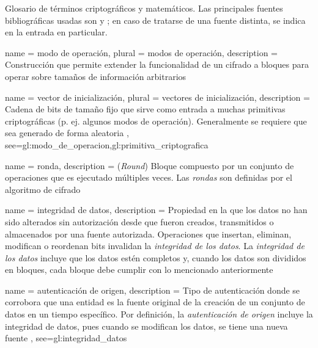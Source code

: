 %
%
%


\makeglossaries

\setglossarypreamble
{%
  Glosario de términos criptográficos y matemáticos. Las principales fuentes
  bibliográficas usadas son \cite{menezes} y \cite{stallings}; en caso de
  tratarse de una fuente distinta, se indica en la entrada en particular.
}

{
  name = modo de operación,
  plural = modos de operación,
  description = {
    Construcción que permite extender la funcionalidad de un cifrado a bloques
    para operar sobre tamaños de información arbitrarios%
  }
}

{
  name = vector de inicialización,
  plural = vectores de inicialización,
  description = {
    Cadena de bits de tamaño fijo que sirve como entrada a muchas primitivas
    criptográficas (p. ej. algunos modos de operación). Generalmente
    se requiere que sea generado de forma aleatoria%
  },
  see={gl:modo_de_operacion,gl:primitiva_criptografica}
}

{
  name = ronda,
  description = {
    (\textit{Round}) Bloque compuesto por un conjunto de operaciones que es
    ejecutado múltiples veces. Las \textit{rondas} son definidas por el
    algoritmo de cifrado%
  }
}

{
  name = integridad de datos,
  description = {
    Propiedad en la que los datos no han sido alterados sin autorización desde
    que fueron creados, transmitidos o almacenados por una fuente autorizada.
    Operaciones que insertan, eliminan, modifican o reordenan bits invalidan
    la \textit{integridad de los datos}. La \textit{integridad de los datos}
    incluye que los datos estén completos y, cuando los datos son divididos en
    bloques, cada bloque debe cumplir con lo mencionado anteriormente%
  }
}

{
  name = autenticación de origen,
  description = {
    Tipo de autenticación donde se corrobora que una entidad es la fuente
    original de la creación de un conjunto de datos en un tiempo específico.
    Por definición, la \textit{autenticación de origen} incluye la integridad
    de datos, pues cuando se modifican los datos, se tiene una nueva fuente%
  },
  see={gl:integridad_datos}
}

